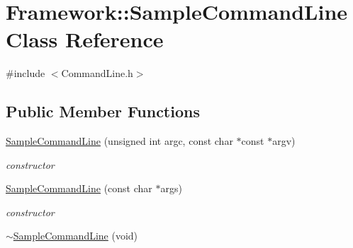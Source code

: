 \hypertarget{classFramework_1_1SampleCommandLine}{
\section{Framework::SampleCommandLine Class Reference}
\label{classFramework_1_1SampleCommandLine}
}


{\ttfamily \#include $<$CommandLine.h$>$}\subsection*{Public Member Functions}
\begin{DoxyCompactItemize}
\item 
\hypertarget{classFramework_1_1SampleCommandLine_ab6ac9f93ae4115f2352c196ede40fb22}{
\hyperlink{classFramework_1_1SampleCommandLine_ab6ac9f93ae4115f2352c196ede40fb22}{SampleCommandLine} (unsigned int argc, const char $\ast$const $\ast$argv)}
\label{classFramework_1_1SampleCommandLine_ab6ac9f93ae4115f2352c196ede40fb22}

\begin{DoxyCompactList}\small\item\em constructor \item\end{DoxyCompactList}\item 
\hypertarget{classFramework_1_1SampleCommandLine_a4cc6fd8e20072dcb181473ca4748da44}{
\hyperlink{classFramework_1_1SampleCommandLine_a4cc6fd8e20072dcb181473ca4748da44}{SampleCommandLine} (const char $\ast$args)}
\label{classFramework_1_1SampleCommandLine_a4cc6fd8e20072dcb181473ca4748da44}

\begin{DoxyCompactList}\small\item\em constructor \item\end{DoxyCompactList}\item 
\hypertarget{classFramework_1_1SampleCommandLine_a7f1921560f4832e5390463dd9f2e00dd}{
\hyperlink{classFramework_1_1SampleCommandLine_a7f1921560f4832e5390463dd9f2e00dd}{$\sim$SampleCommandLine} (void)}
\label{classFramework_1_1SampleCommandLine_a7f1921560f4832e5390463dd9f2e00dd}


\end{DoxyCompactItemize}
